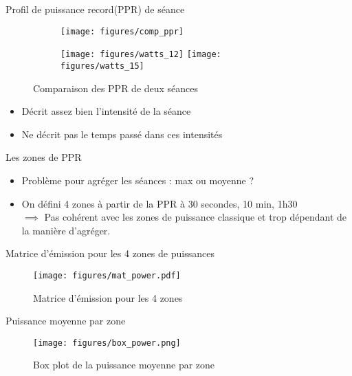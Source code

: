 \documentclass{beamer}
\begin{document}
\begin{frame}{Profil de puissance record(PPR) de séance}
    \begin{figure}
        \begin{subfigure}{0.55\textwidth}
            \centering
            \texttt{[image: figures/comp\_ppr]}
        \end{subfigure}
        \begin{subfigure}{0.4\textwidth}
            \centering
            \texttt{[image: figures/watts\_12]}
            \texttt{[image: figures/watts\_15]}
        \end{subfigure}
        \caption{Comparaison des PPR de deux séances}
    \end{figure}
    \vspace*{-.5cm}
    \begin{itemize}
        \item Décrit assez bien l'intensité de la séance
        \item Ne décrit pas le temps passé dans ces intensités
    \end{itemize}
\end{frame}


\begin{frame}{Les zones de PPR}
    \begin{itemize}
        \item Problème pour agréger les séances : max ou moyenne ? %
        \item On défini 4 zones à partir de la PPR à 30 secondes, 10 min, 1h30 \\
        $\implies$ Pas cohérent avec les zones de puissance classique et trop dépendant de la manière d'agréger.
    \end{itemize}
    \end{frame}

\begin{frame}{Matrice d'émission pour les 4 zones de puissances}
    \begin{figure}
        \centering
        \texttt{[image: figures/mat\_power.pdf]}
        \caption{Matrice d'émission pour les 4 zones}
    \end{figure}
\end{frame}

\begin{frame}{Puissance moyenne par zone}
    \begin{figure}
        \centering
        \texttt{[image: figures/box\_power.png]}
        \caption{Box plot de la puissance moyenne par zone}
    \end{figure}
\end{frame}
\end{document}
